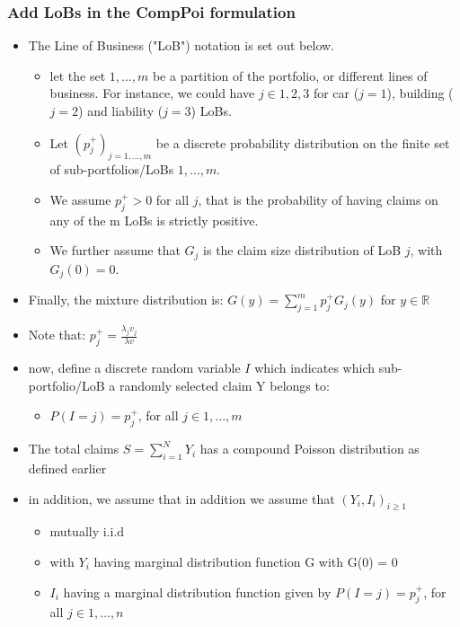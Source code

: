 \documentclass{article}
\begin{document}
\subsubsection{Add LoBs in the CompPoi formulation}
\begin{itemize}
    \item The Line of Business ("LoB") notation is set out below.
    \begin{itemize}
        \item let the set ${1,...,m}$ be a partition of the portfolio, or different lines of business. For instance, we could have $j \in {1,2,3}$ for car ($j=1$), building ($j=2$) and liability ($j=3$) LoBs.
        \item Let $(p^+_j)_{j=1,...,m}$ be a discrete probability distribution on the finite set of sub-portfolios/LoBs $1,...,m$.
        \item We assume
        \subitem $p^+_j > 0$ for all $j$, that is the probability of having claims on any of the m LoBs is strictly positive.
        \item We further assume that $G_j$ is the claim size distribution of LoB $j$, with $G_j(0) = 0$.
    \end{itemize}
    \item Finally, the mixture distribution is:
    \subitem $G(y) = \sum_{j=1}^m p^+_j G_j(y)$ for $y \in \mathbb{R}$
    \item Note that: \hspace{1cm} $p^+_j = \frac{\lambda _j v_j}{\lambda v}$
    \item now, define a discrete random variable $I$ which indicates which sub-portfolio/LoB a randomly selected claim Y belongs to:
    \begin{itemize}
        \item $P(I=j) = p^+_j$, \hspace{1cm} for all $j \in {1,...,m}$
    \end{itemize}
    \item The total claims $S = \sum_{i=1}^N Y_i$ has a compound Poisson distribution as defined earlier
    \item in addition, we assume that
    \subitem in addition we assume that $(Y_i,I_i)_{i \geq 1}$
    \begin{itemize}
        \item mutually i.i.d
        \item with $Y_i$ having marginal distribution function G with G(0) = 0
        \item $I_i$ having a marginal distribution function given by
        \subitem $P(I=j) = p^+_j$, for all $j \in 1,...,n$
    \end{itemize}
\end{itemize}
\end{document}
